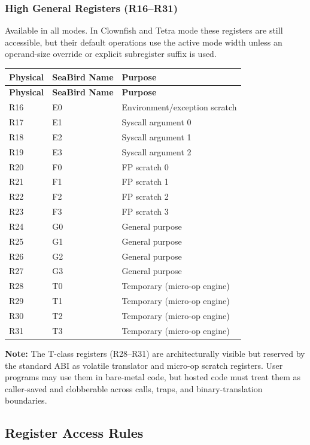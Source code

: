 \documentclass[11pt]{article}
\begin{document}
\subsubsection{High General Registers (R16--R31)}

Available in all modes. In Clownfish and Tetra mode these registers are still accessible, but their default operations use the active mode width unless an operand-size override or explicit subregister suffix is used.

\begin{longtable}{@{}lll@{}}
\toprule
\textbf{Physical} & \textbf{SeaBird Name} & \textbf{Purpose} \\ \midrule
\endfirsthead
\toprule
\textbf{Physical} & \textbf{SeaBird Name} & \textbf{Purpose} \\ \midrule
\endhead
R16 & E0 & Environment/exception scratch \\
R17 & E1 & Syscall argument 0 \\
R18 & E2 & Syscall argument 1 \\
R19 & E3 & Syscall argument 2 \\
R20 & F0 & FP scratch 0 \\
R21 & F1 & FP scratch 1 \\
R22 & F2 & FP scratch 2 \\
R23 & F3 & FP scratch 3 \\
R24 & G0 & General purpose \\
R25 & G1 & General purpose \\
R26 & G2 & General purpose \\
R27 & G3 & General purpose \\
R28 & T0 & Temporary (micro-op engine) \\
R29 & T1 & Temporary (micro-op engine) \\
R30 & T2 & Temporary (micro-op engine) \\
R31 & T3 & Temporary (micro-op engine) \\ \bottomrule
\end{longtable}

\textbf{Note:} The T-class registers (R28--R31) are architecturally visible but reserved by the standard ABI as volatile translator and micro-op scratch registers. User programs may use them in bare-metal code, but hosted code must treat them as caller-saved and clobberable across calls, traps, and binary-translation boundaries.

\subsection{Register Access Rules}
\end{document}
